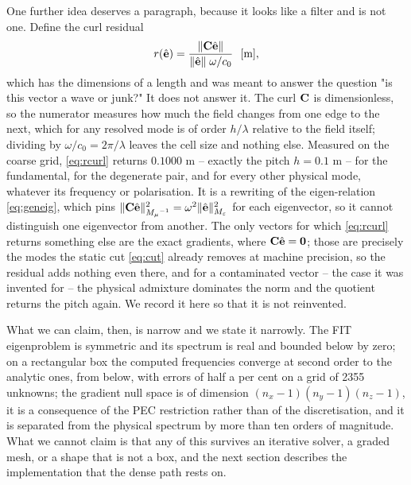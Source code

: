 One further idea deserves a paragraph, because it looks like a filter and is not one. Define the
curl residual
\begin{equation}
  r(\hat{\mathbf{e}}) = \frac{\|\mathbf{C}\hat{\mathbf{e}}\|}{\|\hat{\mathbf{e}}\|\;\omega/c_0} \ \
[\mathrm{m}],
  \label{eq:rcurl}
\end{equation}
which has the dimensions of a length and was meant to answer the question "is this vector a wave or
junk?" It
does not answer it. The curl $\mathbf{C}$ is dimensionless, so the numerator measures how much the field
changes from
one edge to the next, which for any resolved mode is of order $h/\lambda$ relative to the field
itself; dividing
by $\omega/c_0=2\pi/\lambda$ leaves the cell size and nothing else. Measured on the coarse grid,
\eqref{eq:rcurl}
returns $0.1000$ m -- exactly the pitch $h=0.1$ m -- for the fundamental, for the degenerate pair,
and for every
other physical mode, whatever its frequency or polarisation. It is a rewriting of the eigen-relation
\eqref{eq:geneig}, which pins
$\|\mathbf{C}\hat{\mathbf{e}}\|^{2}_{{M_{\mu}}^{-1}}=\omega^{2}\|\hat{\mathbf{e}}\|^{2}_{{M_{\varepsilon}}}$
for each eigenvector, so it cannot distinguish one eigenvector from another. The only vectors for
which
\eqref{eq:rcurl} returns something else are the exact gradients, where
$\mathbf{C}\hat{\mathbf{e}}=\mathbf{0}$; those
are precisely the modes the static cut \eqref{eq:cut} already removes at machine precision, so the
residual adds
nothing even there, and for a contaminated vector -- the case it was invented for -- the physical
admixture
dominates the norm and the quotient returns the pitch again. We record it here so that it is not
reinvented.

What we can claim, then, is narrow and we state it narrowly. The FIT eigenproblem is symmetric and
its spectrum is real and bounded below by zero; on a rectangular box the computed frequencies
converge at second order to the analytic ones, from below, with errors of half a per cent on a grid
of 2355 unknowns; the gradient null space is of dimension $(n_x-1)(n_y-1)(n_z-1)$, it is a
consequence of the PEC restriction rather than of the discretisation, and it is separated from the
physical spectrum by more than ten orders of magnitude. What we cannot claim is that any of this
survives an iterative solver, a graded mesh, or a shape that is not a box, and the next section
describes the implementation that the dense path rests on.
